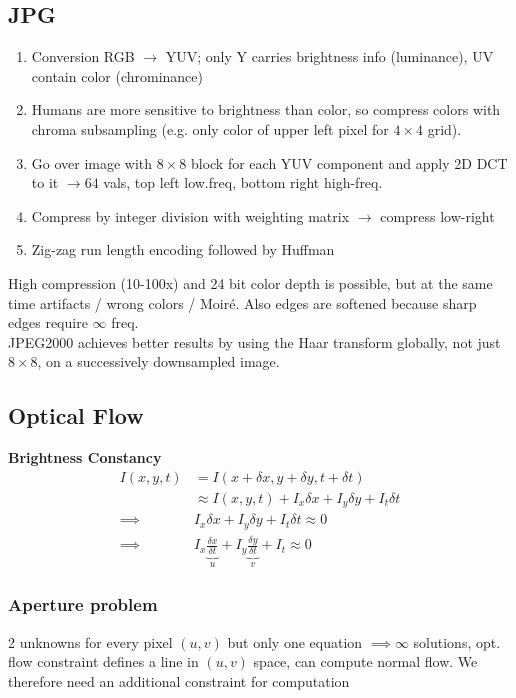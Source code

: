 \documentclass[a4paper,10pt]{article}
\begin{document}
\subsection{JPG}
\begin{enumerate}
    \item Conversion RGB \( \to \) YUV; only Y carries brightness info (luminance), UV contain color (chrominance)
    \item Humans are more sensitive to brightness than color, so compress colors with chroma subsampling (e.g. only color of upper left pixel for \( 4\times 4\) grid).
    \item Go over image with \( 8 \times 8 \) block for each YUV component and apply 2D DCT to it \( \rightarrow 64 \) vals, top left low.freq, bottom right high-freq.
    \item Compress by integer division with weighting matrix \( \rightarrow \) compress low-right
    \item Zig-zag run length encoding followed by Huffman
\end{enumerate}
High compression (10-100x) and 24 bit color depth is possible, but at the same time artifacts / wrong colors / Moiré. Also edges are softened because sharp edges require \( \infty \) freq.\\
JPEG2000 achieves better results by using the Haar transform globally, not just \( 8 \times 8 \), on a successively downsampled image.

\subsection{Optical Flow}
\textbf{Brightness Constancy}
\begin{align*}
    I(x,y,t) &= I(x+ \delta x, y + \delta y, t + \delta t) \\
	     &\approx I(x,y,t) + I_x \delta x + I_y \delta y + I_t \delta t \tag{Taylor approx., good if small motion}\\
    \implies &I_x \delta x + I_y \delta y + I_t \delta t \approx 0 \\
    \implies &I_x \underbrace{\frac{\delta x}{\delta t}}_u + I_y \underbrace{\frac{\delta y}{\delta t}}_v + I_t \approx 0
\end{align*}
\subsubsection{Aperture problem} 2 unknowns for every pixel \( (u,v) \) but only one equation \( \implies \infty\)  solutions, opt. flow constraint defines a line in \( (u,v) \) space, can compute normal flow. We therefore need an additional constraint for computation
\end{document}

